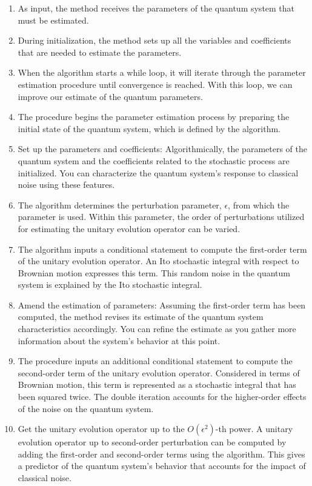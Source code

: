 \documentclass[journal,twocolumn]{IEEEtran}
\begin{document}
\begin{enumerate}   
  \item As input, the method receives the parameters of the quantum system that must be estimated.
 \item During initialization, the method sets up all the variables and coefficients that are needed to estimate the parameters.
 \item When the algorithm starts a while loop, it will iterate through the parameter estimation procedure until convergence is reached. With this loop, we can improve our estimate of the quantum parameters.
 \item The procedure begins the parameter estimation process by preparing the initial state of the quantum system, which is defined by the algorithm.
 \item Set up the parameters and coefficients: Algorithmically, the parameters of the quantum system and the coefficients related to the stochastic process are initialized. You can characterize the quantum system's response to classical noise using these features.
 \item The algorithm determines the perturbation parameter, $\epsilon$, from which the parameter is used. Within this parameter, the order of perturbations utilized for estimating the unitary evolution operator can be varied.
 \item The algorithm inputs a conditional statement to compute the first-order term of the unitary evolution operator. An Ito stochastic integral with respect to Brownian motion expresses this term. This random noise in the quantum system is explained by the Ito stochastic integral.
 \item Amend the estimation of parameters: Assuming the first-order term has been computed, the method revises its estimate of the quantum system characteristics accordingly. You can refine the estimate as you gather more information about the system's behavior at this point.
 \item The procedure inputs an additional conditional statement to compute the second-order term of the unitary evolution operator. Considered in terms of Brownian motion, this term is represented as a stochastic integral that has been squared twice. The double iteration accounts for the higher-order effects of the noise on the quantum system. 
 \item Get the unitary evolution operator up to the $O(\epsilon^2)$-th power. A unitary evolution operator up to second-order perturbation can be computed by adding the first-order and second-order terms using the algorithm. This gives a predictor of the quantum system's behavior that accounts for the impact of classical noise.

\end{enumerate}
\end{document}
